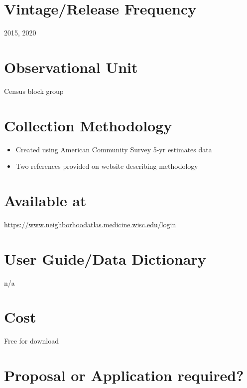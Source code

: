 \documentclass[
]{book}
\providecommand{\tightlist}{%
  \setlength{\itemsep}{0pt}\setlength{\parskip}{0pt}}
\begin{document}
\hypertarget{vintagerelease-frequency-9}{%
\section{Vintage/Release Frequency}\label{vintagerelease-frequency-9}}

2015, 2020

\hypertarget{observational-unit-9}{%
\section{Observational Unit}\label{observational-unit-9}}

Census block group

\hypertarget{collection-methodology-9}{%
\section{Collection Methodology}\label{collection-methodology-9}}

\begin{itemize}
\tightlist
\item
  Created using American Community Survey 5-yr estimates data
\item
  Two references provided on website describing methodology
\end{itemize}

\hypertarget{available-at-9}{%
\section{Available at}\label{available-at-9}}

\url{https://www.neighborhoodatlas.medicine.wisc.edu/login}

\hypertarget{user-guidedata-dictionary-9}{%
\section{User Guide/Data Dictionary}\label{user-guidedata-dictionary-9}}

n/a

\hypertarget{cost-9}{%
\section{Cost}\label{cost-9}}

Free for download

\hypertarget{proposal-or-application-required-9}{%
\section{Proposal or Application required?}\label{proposal-or-application-required-9}}
\end{document}
